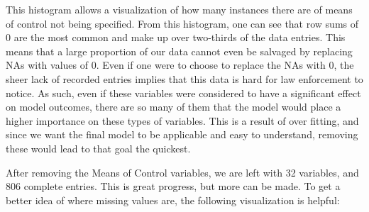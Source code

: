 \documentclass{article} %
\begin{document}
	This histogram allows a visualization of how many instances there are of means of control not being specified. From this histogram, one can see that row sums of 0 are the most common and make up over two-thirds of the data entries. This means that a large proportion of our data cannot even be salvaged by replacing NAs with values of 0. Even if one were to choose to replace the NAs with 0, the sheer lack of recorded entries implies that this data is hard for law enforcement to notice. As such, even if these variables were considered to have a significant effect on model outcomes, there are so many of them that the model would place a higher importance on these types of variables. This is a result of over fitting, and since we want the final model to be applicable and easy to understand, removing these would lead to that goal the quickest.
	
	After removing the Means of Control variables, we are left with 32 variables, and 806 complete entries. This is great progress, but more can be made. To get a better idea of where missing values are, the following visualization is helpful:
	
\end{document}
